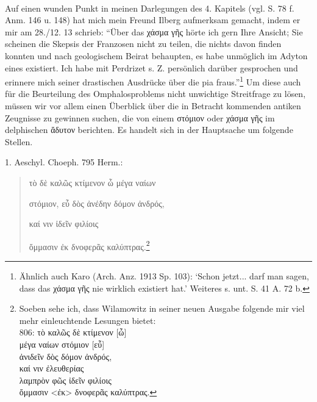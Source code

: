\documentclass[a4paper, 11pt, oneside]{article}
\begin{document}
\paragraph{}
Auf einen wunden Punkt in meinen Darlegungen des 4. Kapitels (vgl. S. 78 f. Anm. 146 u. 148) hat mich mein Freund Ilberg aufmerksam gemacht, indem er mir am 28./12. 13 schrieb: "`Über das χάσμα γῆς hörte ich gern Ihre Ansicht; Sie scheinen die Skepsis der Franzosen nicht zu teilen, die nichts davon finden konnten und nach geologischem Beirat behaupten, es habe unmöglich im Adyton eines existiert. Ich habe mit Perdrizet s. Z. persönlich darüber gesprochen und erinnere mich seiner drastischen Ausdrücke über die pia fraus."'\footnote{Ähnlich auch Karo (Arch. Anz. 1913 Sp. 103): `Schon jetzt... darf man sagen, dass das χάσμα γῆς nie wirklich existiert hat.' Weiteres s. unt. S. 41 A. 72 b.} Um diese auch für die Beurteilung des Omphalosproblems nicht unwichtige Streitfrage zu lösen, müssen wir vor allem einen Überblick über die in Betracht kommenden antiken Zeugnisse zu gewinnen suchen, die von einem στόμιον oder χάσμα γῆς im delphischen ἄδυτον berichten. Es handelt sich in der Hauptsache um folgende Stellen.

1. Aeschyl. Choeph. 795 Herm.:
\begin{quotation}
τὸ δὲ καλῶς κτίμενον ὦ μέγα ναίων

στόμιον, εὖ δὸς ἀνέδην δόμον ἀνδρός,

καί νιν ἰδεῖν φιλίοις

ὄμμασιν ἐκ δνοφερᾶς καλύπτρας.\footnote{Soeben sehe ich, dass Wilamowitz in seiner neuen Ausgabe folgende mir viel mehr einleuchtende Lesungen bietet:\\\hspace*{5mm}806: τὸ καλῶς δὲ κτίμενον [ὦ]\\\hspace*{11mm}μέγα ναίων στόμιον [εὖ]\\\hspace*{11mm}ἀνιδεῖν δὸς δόμον ἀνδρός,\\\hspace*{11mm}καί νιν ἐλευθερίας\\\hspace*{11mm}λαμπρὸν φῶς ἰδεῖν φιλίοις\\\hspace*{11mm}ὄμμασιν <ἐκ> δνοφερᾶς καλύπτρας.}
\end{quotation}
\end{document}
